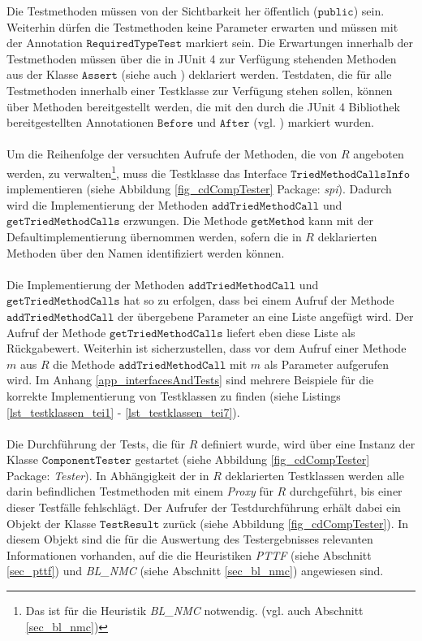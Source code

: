 \noindent
Die Testmethoden müssen von der Sichtbarkeit her öffentlich ($\texttt{public}$) sein. Weiterhin dürfen die Testmethoden keine Parameter erwarten und müssen mit der Annotation $\texttt{RequiredTypeTest}$ markiert sein. Die Erwartungen innerhalb der Testmethoden müssen über die in JUnit 4 zur Verfügung stehenden Methoden aus der Klasse $\texttt{Assert}$ (siehe auch \cite{junit_api}) deklariert werden. Testdaten, die für alle Testmethoden innerhalb einer Testklasse zur Verfügung stehen sollen, können über Methoden bereitgestellt werden, die mit den durch die JUnit 4 Bibliothek bereitgestellten Annotationen $\texttt{Before}$ und $\texttt{After}$ (vgl. \cite{junit_api}) markiert wurden.
\\\\
Um die Reihenfolge der versuchten Aufrufe der Methoden, die von $R$ angeboten werden, zu verwalten\footnote{Das ist für die Heuristik \emph{BL\_NMC} notwendig. (vgl. auch Abschnitt \ref{sec_bl_nmc})}, muss die Testklasse das \Gls{Interface} $\texttt{TriedMethodCallsInfo}$ implementieren (siehe Abbildung \ref{fig_cdCompTester} Package: \emph{spi}). Dadurch wird die Implementierung der Methoden $\texttt{addTriedMethodCall}$ und $\texttt{getTriedMethodCalls}$ erzwungen. Die Methode $\texttt{getMethod}$ kann mit der Defaultimplementierung übernommen werden, sofern die in $R$ deklarierten Methoden über den Namen identifiziert werden können.
\\\\
Die Implementierung der Methoden $\texttt{addTriedMethodCall}$ und $\texttt{getTriedMethodCalls}$ hat so zu erfolgen, dass bei einem Aufruf der Methode $\texttt{addTriedMethodCall}$ der übergebene Parameter an eine Liste angefügt wird. Der Aufruf der Methode $\texttt{getTriedMethodCalls}$ liefert eben diese Liste als Rückgabewert. Weiterhin ist sicherzustellen, dass vor dem Aufruf einer Methode $m$ aus $R$ die Methode $\texttt{addTriedMethodCall}$ mit $m$ als Parameter aufgerufen wird. Im Anhang \ref{app_interfacesAndTests} sind mehrere Beispiele für die korrekte Implementierung von Testklassen zu finden (siehe Listings \ref{lst_testklassen_tei1} - \ref{lst_testklassen_tei7}).
\\\\
Die Durchführung der Tests, die für $R$ definiert wurde, wird über eine Instanz der Klasse $\texttt{ComponentTester}$ gestartet (siehe Abbildung \ref{fig_cdCompTester} Package: \emph{Tester}). In Abhängigkeit der in $R$ deklarierten Testklassen werden alle darin befindlichen Testmethoden mit einem \emph{Proxy} für $R$ durchgeführt, bis einer dieser Testfälle fehlschlägt. Der Aufrufer der Testdurchführung erhält dabei ein Objekt der Klasse $\texttt{TestResult}$ zurück (siehe Abbildung \ref{fig_cdCompTester}). In diesem Objekt sind die für die Auswertung des Testergebnisses relevanten Informationen vorhanden, auf die die Heuristiken \emph{PTTF} (siehe Abschnitt \ref{sec_pttf}) und \emph{BL\_NMC} (siehe Abschnitt \ref{sec_bl_nmc}) angewiesen sind.
